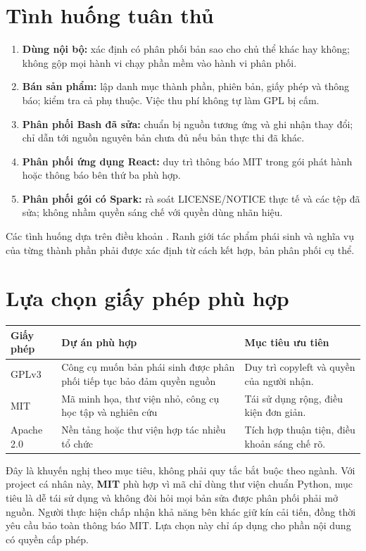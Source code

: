 \documentclass[12pt,a4paper]{article}
\begin{document}
\section{Tình huống tuân thủ}
\begin{enumerate}
\item \textbf{Dùng nội bộ:} xác định có phân phối bản sao cho chủ thể khác hay không; không gộp mọi hành vi chạy phần mềm vào hành vi phân phối.
\item \textbf{Bán sản phẩm:} lập danh mục thành phần, phiên bản, giấy phép và thông báo; kiểm tra cả phụ thuộc. Việc thu phí không tự làm GPL bị cấm.
\item \textbf{Phân phối Bash đã sửa:} chuẩn bị nguồn tương ứng và ghi nhận thay đổi; chỉ dẫn tới nguồn nguyên bản chưa đủ nếu bản thực thi đã khác.
\item \textbf{Phân phối ứng dụng React:} duy trì thông báo MIT trong gói phát hành hoặc thông báo bên thứ ba phù hợp.
\item \textbf{Phân phối gói có Spark:} rà soát LICENSE/NOTICE thực tế và các tệp đã sửa; không nhầm quyền sáng chế với quyền dùng nhãn hiệu.
\end{enumerate}
Các tình huống dựa trên điều khoản \cite{gpl,gplfaq,mit,apache,apachefaq}. Ranh giới tác phẩm phái sinh và nghĩa vụ của từng thành phần phải được xác định từ cách kết hợp, bản phân phối cụ thể.

\section{Lựa chọn giấy phép phù hợp}
\begin{center}\small
\begin{tabularx}{\textwidth}{@{}p{2.0cm}YY@{}}
\toprule
\textbf{Giấy phép} & \textbf{Dự án phù hợp} & \textbf{Mục tiêu ưu tiên}\\
\midrule
GPLv3 & Công cụ muốn bản phái sinh được phân phối tiếp tục bảo đảm quyền nguồn & Duy trì copyleft và quyền của người nhận.\\
MIT & Mã minh họa, thư viện nhỏ, công cụ học tập và nghiên cứu & Tái sử dụng rộng, điều kiện đơn giản.\\
Apache 2.0 & Nền tảng hoặc thư viện hợp tác nhiều tổ chức & Tích hợp thuận tiện, điều khoản sáng chế rõ.\\
\bottomrule
\end{tabularx}
\end{center}
Đây là khuyến nghị theo mục tiêu, không phải quy tắc bắt buộc theo ngành. Với project cá nhân này, \textbf{MIT} phù hợp vì mã chỉ dùng thư viện chuẩn Python, mục tiêu là dễ tái sử dụng và không đòi hỏi mọi bản sửa được phân phối phải mở nguồn. Người thực hiện chấp nhận khả năng bên khác giữ kín cải tiến, đồng thời yêu cầu bảo toàn thông báo MIT. Lựa chọn này chỉ áp dụng cho phần nội dung có quyền cấp phép.
\end{document}
